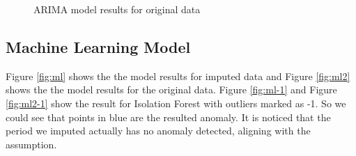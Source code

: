 \documentclass[
]{article}
\begin{document}
\begin{figure}[H]

{\centering {}

}

\caption{ARIMA model results for original data}\label{fig:ts2}
\end{figure}

\subsection{Machine Learning Model}\label{machine-learning-model}

Figure \ref{fig:ml} shows the the model results for imputed data and Figure \ref{fig:ml2} shows the the model results for the original data. Figure \ref{fig:ml-1} and Figure \ref{fig:ml2-1} show the result for Isolation Forest with outliers marked as -1. So we could see that points in blue are the resulted anomaly. It is noticed that the period we imputed actually has no anomaly detected, aligning with the assumption.
\end{document}
